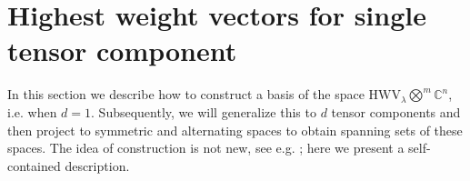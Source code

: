 \documentclass[12pt, reqno]{amsart}
\theoremstyle{definition}
\let\oldbigwedge\bigwedge
\renewcommand{\bigwedge}{
  \mathop{
    \vcenter{
      \hbox{\scalebox{0.9}{$\displaystyle\oldbigwedge$}}
    }
  }
}
\begin{document}


\section{Highest weight vectors for single tensor component}\label{sec:spanningset}
In this section we describe how to construct a basis of the space $\mathrm{HWV}_{{\lambda}} \bigotimes^m\mathbb{C}^n$, i.e. when $d = 1$.
Subsequently, we will generalize this to $d$ tensor components and then project to symmetric and alternating spaces to obtain spanning sets of these spaces. The idea of construction is not new, see e.g. \cite{bi, widg, widg1}; 
here we present a self-contained description. %
\end{document}
